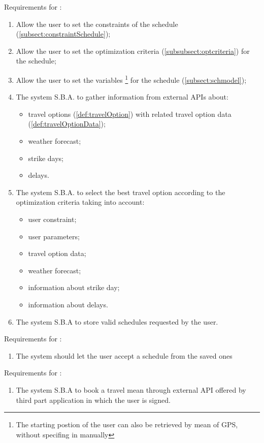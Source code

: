 Requirements for :
\begin{enumerate}[resume]
\renewcommand\labelenumi{\textbf{R\theenumi}}
\item Allow the user to set the constraints of the schedule (\ref{subsect:constraintSchedule}); \label{req:R12}
\item Allow the user to set the optimization criteria (\ref{subsubsect:optcriteria}) for the schedule; \label{req:R13}
\item Allow the user to set the variables \footnote{The starting postion of the user can also be retrieved by mean of GPS, without specifing in manually} for the schedule (\ref{subsect:schmodel});   \label{req:R14}
\item The system S.B.A. to gather information from external APIs about: 
	\begin{itemize}
		\item travel options (\ref{def:travelOption}) with related travel option data (\ref{def:travelOptionData}); 
		\item weather forecast;
		\item strike days;
		\item delays.
	\end{itemize} \label{req:R15}
\item The system S.B.A. to select the best travel option according to the optimization criteria taking into account:
	\begin{itemize}
		\item user constraint;
		\item user parameters;
		\item travel option data; 
		\item weather forecast;
		\item information about strike day;
		\item information about delays.
\end{itemize} \label{req:R16}
\item The system S.B.A to store valid schedules requested by the user. \label{req:R17} 
\end{enumerate}

Requirements for :
\begin{enumerate}[resume]
\renewcommand\labelenumi{\textbf{R\theenumi}}
\item The system should let the user accept a schedule from the saved ones \label{req:R18}
\end{enumerate}

Requirements for :
\begin{enumerate}[resume]
\renewcommand\labelenumi{\textbf{R\theenumi}}
\item The system S.B.A to book a travel mean through external API offered by third part application in which the user is signed. \label{req:R19}
\end{enumerate}

